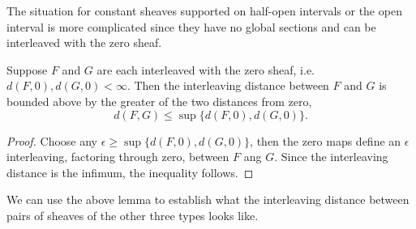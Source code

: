 The situation for constant sheaves supported on half-open intervals or the open interval is more complicated since they have no global sections and can be interleaved with the zero sheaf.

\begin{lem}\label{lem:distance_from_0}
Suppose $F$ and $G$ are each interleaved with the zero sheaf, i.e. $d(F,0),d(G,0)<\infty$. Then the interleaving distance between $F$ and $G$ is bounded above by the greater of the two distances from zero,
\[
d(F,G)\leq \sup\{d(F,0),d(G,0)\}.
\]
\end{lem}
\begin{proof}
Choose any $\epsilon\geq \sup\{d(F,0),d(G,0)\}$, then the zero maps define an $\epsilon$ interleaving, factoring through zero, between $F$ ang $G$. Since the interleaving distance is the infimum, the inequality follows.
\end{proof}

We can use the above lemma to establish what the interleaving distance between pairs of sheaves of the other three types looks like.

